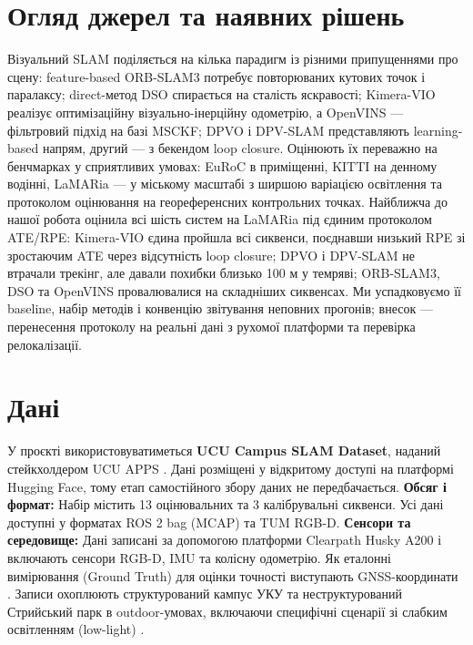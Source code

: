\documentclass[ukrainian]{ucuproposal}
\begin{document}
\section{Огляд джерел та наявних рішень}
Візуальний SLAM поділяється на кілька парадигм із різними припущеннями про
сцену: feature-based ORB-SLAM3 \cite{campos2021orbslam3} потребує
повторюваних кутових точок і паралаксу; direct-метод DSO
\cite{engel2018dso} спирається на сталість яскравості; Kimera-VIO
\cite{rosinol2020kimera} реалізує оптимізаційну візуально-інерційну
одометрію, а OpenVINS \cite{geneva2020openvins} --- фільтровий підхід на
базі MSCKF; DPVO \cite{teed2023dpvo} і DPV-SLAM \cite{lipson2024dpvslam}
представляють learning-based напрям, другий --- з бекендом loop closure.
Оцінюють їх переважно на бенчмарках у сприятливих умовах: EuRoC
\cite{burri2016euroc} в приміщенні, KITTI \cite{geiger2012kitti} на денному
водінні, LaMARia \cite{krishnan2025lamaria} --- у міському масштабі з
ширшою варіацією освітлення та протоколом оцінювання на геореференсних
контрольних точках.
Найближча до нашої робота \cite{basystyi2026lowlight} оцінила всі шість
систем на LaMARia під єдиним протоколом ATE/RPE: Kimera-VIO єдина пройшла
всі сиквенси, поєднавши низький RPE зі зростаючим ATE через відсутність
loop closure; DPVO і DPV-SLAM не втрачали трекінг, але давали похибки
близько 100 м у темряві; ORB-SLAM3, DSO та OpenVINS провалювалися на
складніших сиквенсах. Ми успадковуємо її baseline, набір методів і
конвенцію звітування неповних прогонів; внесок --- перенесення протоколу на
реальні дані з рухомої платформи та перевірка релокалізації.

\section{Дані}
У проєкті використовуватиметься \textbf{UCU Campus SLAM Dataset}, наданий
стейкхолдером UCU APPS \cite{ucu_slam_topic_2026}. Дані розміщені у
відкритому доступі на платформі Hugging Face, тому етап самостійного збору даних не передбачається.
\textbf{Обсяг і формат:} Набір містить 13 оцінювальних \cite{ucu_slam_topic_2026}
та 3 калібрувальні сиквенси. Усі дані доступні у форматах ROS 2 bag (MCAP) та TUM RGB-D. 
\textbf{Сенсори та середовище:} Дані записані за допомогою платформи
Clearpath Husky A200 і включають сенсори RGB-D, IMU та колісну
одометрію. Як еталонні вимірювання (Ground Truth) для оцінки
точності виступають GNSS-координати \cite{ucu_slam_topic_2026}. Записи
охоплюють структурований кампус УКУ та неструктурований Стрийський парк
в outdoor-умовах, включаючи специфічні сценарії зі слабким освітленням
(low-light) \cite{ucu_slam_topic_2026}.
\end{document}
